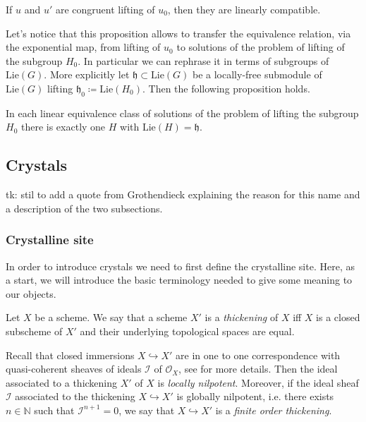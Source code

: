 \documentclass[../Main]{subfiles}
\begin{document}
\begin{lem}
	If $u$ and $u'$ are congruent lifting of $u_0$, then
	they are linearly compatible.
\end{lem} 


\begin{rem}[]
	Let's notice that this proposition allows to
	transfer the equivalence relation, via the exponential map,
	from lifting of $u_0$ to solutions of the problem of lifting
	of the subgroup $H_0$.
	In particular we can rephrase it in terms of subgroups
	of $\mathrm{Lie}(G)$. More explicitly
	let $\mathfrak{h} \subset \mathrm{Lie}(G)$ be a locally-free
	submodule of $\mathrm{Lie}(G)$ lifting
	$\mathfrak{h}_0 \coloneqq \mathrm{Lie}(H_0)$.
	Then the following proposition holds.
\end{rem}


\begin{prop}
	In each linear equivalence class of solutions of
	the problem of lifting the subgroup $H_0$
	there is exactly one $H$ with 
	$\mathrm{Lie}(H) = \mathfrak{h}$.
\end{prop}



\subsection{Crystals}
tk: stil to add a quote from Grothendieck explaining the reason
for this name and a description of the two subsections.



\subsubsection{Crystalline site}
In order to introduce crystals we need to first define the crystalline site.
Here, as a start, we will introduce the basic terminology needed to give
some meaning to our objects.


\begin{defn}[Thickening]
	Let $X$ be a scheme.
	We say that a scheme $X'$ is a {\em thickening} of $X$ iff
	$X$ is a closed subscheme of $X'$ and their underlying topological
	spaces are equal.
\end{defn}


\begin{rem}[]\label{rem:thickeningIdeal}
	Recall that closed immersions $X \hookrightarrow X'$ are in one to
	one correspondence with quasi-coherent sheaves of ideals
	$\mathcal{I}$ of $\mathcal{O}_{ X }$, see
	\cite[\href{https://stacks.math.columbia.edu/tag/01QN}{Section 01QN}]{SP}
	for more details.
	Then the ideal associated to a thickening $X'$ of $X$ 
	is {\em locally nilpotent}.
	Moreover, if the ideal sheaf $\mathcal{I}$ associated to the thickening
	$X \hookrightarrow X'$ is globally nilpotent, i.e. there exists $n \in \mathbb{N}$
	such that $\mathcal{I}^{n+1} = 0$, we say that $X \hookrightarrow X'$ 
	is a {\em finite order thickening}.
\end{rem}
\end{document}
